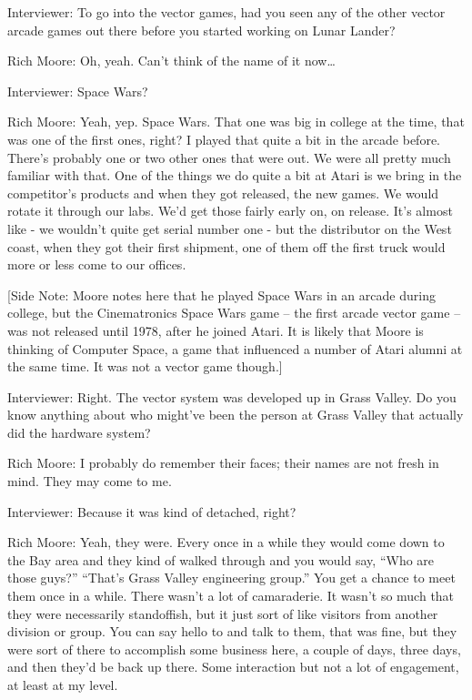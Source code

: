 \textcolor{interviewer}{Interviewer:} To go into the vector games, had you seen any of the other vector arcade games out there before you started working on Lunar Lander?

\textcolor{interviewee}{Rich Moore:} Oh, yeah. Can’t think of the name of it now…

\textcolor{interviewer}{Interviewer:} Space Wars?

\textcolor{interviewee}{Rich Moore:} Yeah, yep. Space Wars. That one was big in college at the time, that was one of the first ones, right? I played that quite a bit in the arcade before. There’s probably one or two other ones that were out. We were all pretty much familiar with that. One of the things we do quite a bit at Atari is we bring in the competitor's products and when they got released, the new games. We would rotate it through our labs. We'd get those fairly early on, on release. It's almost like - we wouldn't quite get serial number one - but the distributor on the West coast, when they got their first shipment, one of them off the first truck would more or less come to our offices.

[Side Note: Moore notes here that he played Space Wars in an arcade during college, but the Cinematronics Space Wars game – the first arcade vector game – was not released until 1978, after he joined Atari. It is likely that Moore is thinking of Computer Space, a game that influenced a number of Atari alumni at the same time. It was not a vector game though.]

\textcolor{interviewer}{Interviewer:} Right. The vector system was developed up in Grass Valley. Do you know anything about who might've been the person at Grass Valley that actually did the hardware system?

\textcolor{interviewee}{Rich Moore:} I probably do remember their faces; their names are not fresh in mind. They may come to me.

\textcolor{interviewer}{Interviewer:} Because it was kind of detached, right?

\textcolor{interviewee}{Rich Moore:} Yeah, they were. Every once in a while they would come down to the Bay area and they kind of walked through and you would say, “Who are those guys?” “That’s Grass Valley engineering group.” You get a chance to meet them once in a while. There wasn't a lot of camaraderie. It wasn't so much that they were necessarily standoffish, but it just sort of like visitors from another division or group. You can say hello to and talk to them, that was fine, but they were sort of there to accomplish some business here, a couple of days, three days, and then they’d be back up there. Some interaction but not a lot of engagement, at least at my level.

